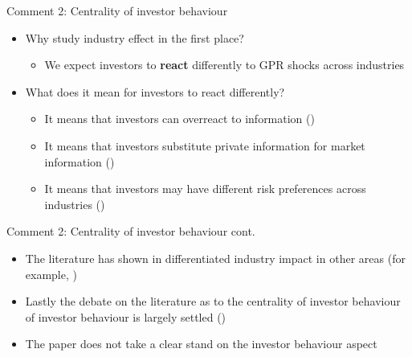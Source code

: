 \documentclass[
  12pt,
  ignorenonframetext,
]{beamer}
\providecommand{\tightlist}{%
  \setlength{\itemsep}{0pt}\setlength{\parskip}{0pt}}
\begin{document}
\begin{frame}[s]{Comment 2: Centrality of investor behaviour}
\label{comment-2-centrality-of-investor-behaviour}

\begin{itemize}
\tightlist
\item
  Why study industry effect in the first place?

  \begin{itemize}
  \tightlist
  \item
    We expect investors to \textbf{react} differently to GPR shocks
    across industries
  \end{itemize}
\item
  What does it mean for investors to react differently?

  \begin{itemize}
  \tightlist
  \item
    It means that investors can overreact to information
    ()
  \item
    It means that investors substitute private information for market
    information ()
  \item
    It means that investors may have different risk preferences across
    industries ()
  \end{itemize}
\end{itemize}
\end{frame}

\begin{frame}[s]{Comment 2: Centrality of investor behaviour cont.}
\label{comment-2-centrality-of-investor-behaviour-cont.}

\begin{itemize}
\tightlist
\item
  The literature has shown in differentiated industry impact in other
  areas (for example, )
\item
  Lastly the debate on the literature as to the centrality of investor
  behaviour of investor behaviour is largely settled
  ()
\item
  The paper does not take a clear stand on the investor behaviour aspect
\end{itemize}
\end{frame}
\end{document}
